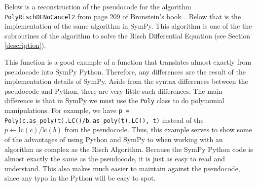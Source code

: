 Below is a reconstruction of the pseudocode for the algorithm
\texttt{Pol\-y\-Risch\-DE\-No\-Can\-cel2} from page 209 of Bronstein's
book~\cite{bronstein2005symbolic}. Below that is the implementation of
the same algorithm in SymPy.  This algorithm is one of the the
subroutines of the algorithm to solve the Risch Differential Equation
(see Section \ref{description}).  

\footnotesize


\normalsize

This function is a good example of a function that translates almost
exactly from pseudocode into SymPy Python.  Therefore, any differences
are the result of the implementation details of SymPy.  Aside from the
syntax differences between the pseudocode and Python, there are very
little such differences.  The main difference is that in SymPy we must
use the \texttt{Poly} class to do polynomial manipulations.  For
example, we have {\tt p = Poly(c.as\_poly(t).LC()/b.as\_poly(t).LC(),
t)} instead of the $p \leftarrow \mathrm{lc}(c)/\mathrm{lc}(b)$ from the
pseudocode.  Thus, this example serves to show some of the advantages of
using Python and SymPy to when working with an algorithm as complex as
the Risch Algorithm.  Because the SymPy Python code is almost exactly
the same as the pseudocode, it is just as easy to read and understand.
This also makes much easier to maintain against the pseudocode, since
any typo in the Python will be easy to spot.
